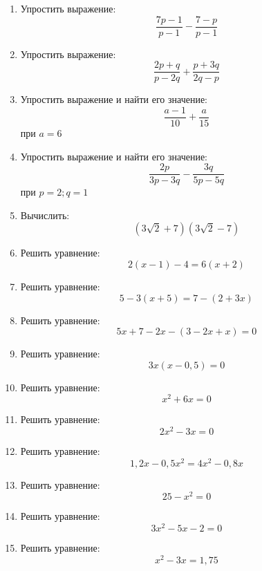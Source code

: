 \documentclass[12pt, a4paper]{article}
\begin{document}
		

\begin{enumerate}
	\item Упростить выражение:
	$$\dfrac{7p-1}{p-1}-\dfrac{7-p}{p-1}$$
	\item Упростить выражение:
	$$\dfrac{2p+q}{p-2q}+\dfrac{p+3q}{2q-p}$$
	\item Упростить выражение и найти его значение:
	$$\dfrac{a-1}{10}+\dfrac{a}{15}$$
	при $a=6$
	\item Упростить выражение и найти его значение:
	$$\dfrac{2p}{3p-3q}-\dfrac{3q}{5p-5q}$$
	при $p=2; q=1$
	\item Вычислить: $$(3\sqrt{2}+7)(3\sqrt{2}-7)$$
	\item Решить уравнение:$$2(x-1)-4=6(x+2)$$
	\item Решить уравнение:$$5-3(x+5)=7-(2+3x)$$
	\item Решить уравнение:$$5x+7-2x-(3-2x+x)=0$$	
	\item Решить уравнение:$$3x(x-0,5)=0$$
	\item Решить уравнение:$$x^2+6x=0$$
	\item Решить уравнение:$$2x^2-3x=0$$
	\item Решить уравнение:$$1,2x-0,5x^2=4x^2-0,8x$$
	\item Решить уравнение:$$25-x^2=0$$
	\item Решить уравнение:$$3x^2-5x-2=0$$
	\item Решить уравнение:$$x^2-3x=1,75$$
	
\end{enumerate}
\end{document}
